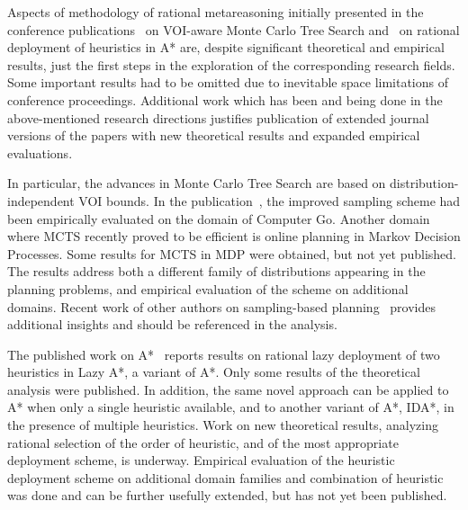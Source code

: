 \documentclass{article}
\begin{document}
Aspects of methodology of rational metareasoning initially
presented in the conference
publications~\cite{TolpinShimony.mcts,HayRussellTolpinShimony.selecting}
on VOI-aware Monte Carlo Tree Search and~\cite{TolpinEtAl.rla}
on rational deployment of heuristics in A* are, despite
significant theoretical and empirical results, just the first
steps in the exploration of the corresponding research fields.
Some important results had to be omitted due to inevitable space
limitations of conference proceedings.  Additional work which
has been and being done in the above-mentioned research directions
justifies publication of extended journal versions of the papers
with new theoretical results and expanded empirical evaluations.  

In particular, the advances in Monte Carlo Tree Search are based on
distribution-independent VOI bounds. In the publication~\cite{HayRussellTolpinShimony.selecting}, the improved
sampling scheme had been empirically evaluated on the domain of
Computer Go.  Another domain where MCTS recently proved to be
efficient is online planning in Markov Decision Processes. Some
results for MCTS in MDP were obtained, but not yet published.
The results address both a different family of distributions
appearing in the planning problems, and empirical evaluation
of the scheme on additional domains. Recent work of other authors
on sampling-based planning~\cite{FeldmanDomshlak.onlinemdp,DomshlakFeldman.uctornot}
provides additional insights and should be referenced in the
analysis. 

The published work on A*~\cite{TolpinEtAl.rla} reports
results on rational lazy deployment
of two heuristics in Lazy A*, a variant of A*. Only some results
of the theoretical analysis were published. In addition, the same
novel approach can be applied to A* when only a single heuristic
available, and to another variant of A*, IDA*, in the presence of
multiple heuristics. Work on new theoretical results, analyzing 
rational selection of the order of heuristic, and of the most
appropriate deployment scheme, is underway. Empirical evaluation
of the heuristic deployment scheme on additional domain families
and combination of heuristic was done and can be further usefully
extended, but has not yet been published.

\maketitle


\end{document}
